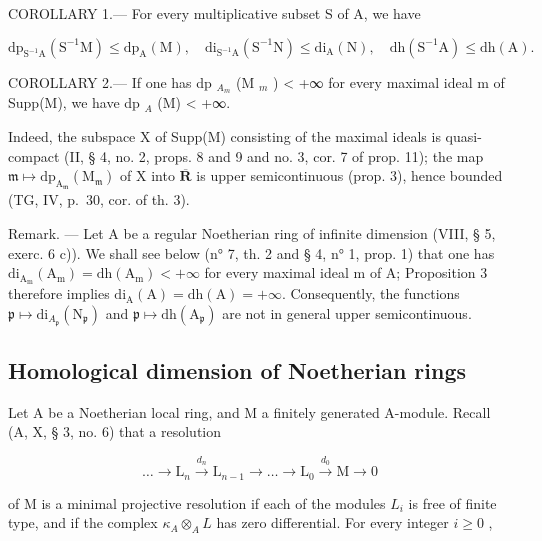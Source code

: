 COROLLARY 1.--- For every multiplicative subset S of A, we have

\[
\mathrm{dp} _ {\mathrm{S} ^ {- 1} \mathrm{A}} (\mathrm{S} ^ {- 1} \mathrm{M}) \leqslant \mathrm{dp} _ {\mathrm{A}} (\mathrm{M}), \quad \mathrm{di} _ {\mathrm{S} ^ {- 1} \mathrm{A}} (\mathrm{S} ^ {- 1} \mathrm{N}) \leqslant \mathrm{di} _ {\mathrm{A}} (\mathrm{N}), \quad \mathrm{dh} (\mathrm{S} ^ {- 1} \mathrm{A}) \leqslant \mathrm{dh} (\mathrm{A}).
\]

COROLLARY 2.--- If one has dp \(_{A_m}\) (M \(_m\) ) \textless{} +∞ for every maximal ideal m of Supp(M), we have dp \(_A\) (M) \textless{} +∞.

Indeed, the subspace X of Supp(M) consisting of the maximal ideals is quasi-compact (II, § 4, no. 2, props. 8 and 9 and no. 3, cor. 7 of prop. 11); the map \(\mathfrak{m} \mapsto \mathrm{dp}_{\mathrm{A}_{\mathfrak{m}}}(\mathrm{M}_{\mathfrak{m}})\) of X into \(\overline{\mathbf{R}}\) is upper semicontinuous (prop. 3), hence bounded (TG, IV, p.~30, cor. of th. 3).

Remark. --- Let A be a regular Noetherian ring of infinite dimension (VIII, § 5, exerc. 6 c)). We shall see below (n° 7, th. 2 and § 4, n° 1, prop. 1) that one has \(\mathrm{di}_{\mathrm{A_m}}(\mathrm{A_m}) = \mathrm{dh}(\mathrm{A_m}) < +\infty\) for every maximal ideal m of A; Proposition 3 therefore implies \(\mathrm{di}_{\mathrm{A}}(\mathrm{A}) = \mathrm{dh}(\mathrm{A}) = +\infty\). Consequently, the functions \(\mathfrak{p} \mapsto \mathrm{di}_{A_{\mathfrak{p}}}(\mathrm{N}_{\mathfrak{p}})\) and \(\mathfrak{p} \mapsto \mathrm{dh}(\mathrm{A}_{\mathfrak{p}})\) are not in general upper semicontinuous.

\subsection{Homological dimension of Noetherian rings}

Let A be a Noetherian local ring, and M a finitely generated A-module. Recall (A, X, § 3, no. 6) that a resolution

\[
\dots \longrightarrow \mathrm{L} _ {n} \stackrel {d _ {n}} {\longrightarrow} \mathrm{L} _ {n - 1} \longrightarrow \dots \longrightarrow \mathrm{L} _ {0} \stackrel {d _ {0}} {\longrightarrow} \mathrm{M} \rightarrow 0
\]

of M is a minimal projective resolution if each of the modules \(L_{i}\) is free of finite type, and if the complex \(\kappa_{A} \otimes_{A} L\) has zero differential. For every integer \(i \geqslant 0\) ,

